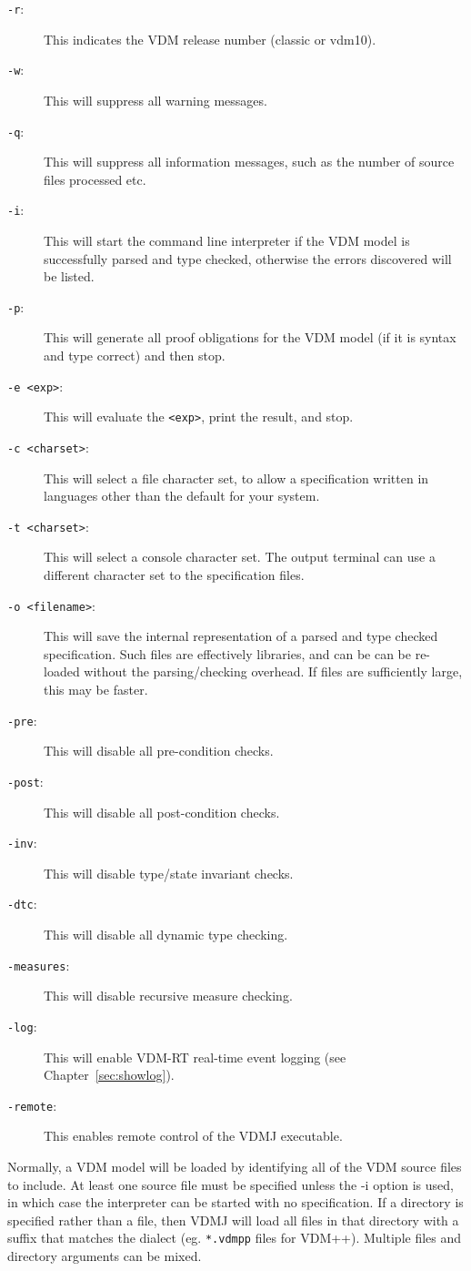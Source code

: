 \documentclass{overturerepchap}
\begin{document}
\begin{description}
\item[\texttt{-r}:] This indicates the VDM release number (classic or vdm10).
\item[\texttt{-w}:] This will suppress all warning messages.
\item[\texttt{-q}:] This will suppress all information messages, such as
 the number of source files processed etc.
\item[\texttt{-i}:] This will start the command line interpreter if the VDM
  model is successfully parsed and type checked, otherwise the errors discovered
  will be listed.
\item[\texttt{-p}:] This will generate all proof obligations for the
  VDM model (if it is syntax and type correct) and then stop.
\item[\texttt{-e <exp>}:] This will evaluate the \texttt{<exp>}, print
  the result, and stop.
\item[\texttt{-c <charset>}:] This will select a file character set, to
allow a specification written in languages other than the default for your system. 
\item[\texttt{-t <charset>}:] This will select a console character set. The output
terminal can use a different character set to the specification files.
\item[\texttt{-o <filename>}:] This will save the internal
  representation of a parsed and type checked spe\-ci\-fication. Such files are
  effectively libraries, and can be can be re-loaded without the
  parsing/checking overhead. If files are sufficiently large, this may be faster.
\item[\texttt{-pre}:] This will disable all pre-condition checks.
\item[\texttt{-post}:] This will disable all post-condition checks.
\item[\texttt{-inv}:] This will disable type/state invariant checks.
\item[\texttt{-dtc}:] This will disable all dynamic type checking.
\item[\texttt{-measures}:] This will disable recursive measure checking.
\item[\texttt{-log}:] This will enable VDM-RT real-time event logging (see Chapter~\ref{sec:showlog}).
\item[\texttt{-remote}:] This enables remote control of the VDMJ executable.
\end{description}

Normally, a VDM model will be loaded by identifying all of the VDM source files to include. At least
one source file must be specified unless the -i option is used, in which case the interpreter can be
started with no specification. If a directory is specified rather than a file, then VDMJ will load
all files in that directory with a suffix that matches the dialect (eg. \texttt{*.vdmpp} files for VDM++).
Multiple files and directory arguments can be mixed.
\end{document}
